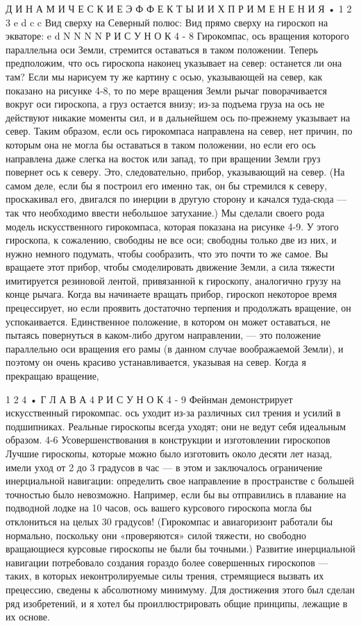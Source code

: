 \documentclass[10pt,oneside]{article}
\begin{document}
Д И Н А М И Ч Е С К И Е  Э Ф Ф Е К Т Ы  И  И Х  П Р И М Е Н Е Н И Я • 1 2 3 e d c c Вид сверху на Северный полюс: Вид прямо сверху на гироскоп на экваторе: e d N N N N Р И С У Н О К  4 - 8 Гирокомпас, ось вращения которого параллельна оси Земли, стремится оставаться в таком положении. Теперь предположим, что ось гироскопа наконец указывает на север: останется ли она там? Если мы нарисуем ту же картину с осью, указывающей на север, как показано на рисунке 4-8, то по мере вращения Земли рычаг поворачивается вокруг оси гироскопа, а груз остается внизу; из-за подъема груза на ось не действуют никакие моменты сил, и в дальнейшем ось по-прежнему указывает на север. Таким образом, если ось гирокомпаса направлена на север, нет причин, по которым она не могла бы оставаться в таком положении, но если его ось направлена даже слегка на восток или запад, то при вращении Земли груз повернет ось к северу. Это, следовательно, прибор, указывающий на север. (На самом деле, если бы я построил его именно так, он бы стремился к северу, проскакивал его, двигался по инерции в другую сторону и качался туда-сюда --- так что необходимо ввести небольшое затухание.) Мы сделали своего рода модель искусственного гирокомпаса, которая показана на рисунке 4-9. У этого гироскопа, к сожалению, свободны не все оси; свободны только две из них, и нужно немного подумать, чтобы сообразить, что это почти то же самое. Вы вращаете этот прибор, чтобы смоделировать движение Земли, а сила тяжести имитируется резиновой лентой, привязанной к гироскопу, аналогично грузу на конце рычага. Когда вы начинаете вращать прибор, гироскоп некоторое время прецессирует, но если проявить достаточно терпения и продолжать вращение, он успокаивается. Единственное положение, в котором он может оставаться, не пытаясь повернуться в каком-либо другом направлении, --- это положение параллельно оси вращения его рамы (в данном случае воображаемой Земли), и поэтому он очень красиво устанавливается, указывая на север. Когда я прекращаю вращение,\par

1 2 4 • Г Л А В А  4 Р И С У Н О К  4 - 9 Фейнман демонстрирует искусственный гирокомпас. ось уходит из-за различных сил трения и усилий в подшипниках. Реальные гироскопы всегда уходят; они не ведут себя идеальным образом. 4-6 Усовершенствования в конструкции и изготовлении гироскопов Лучшие гироскопы, которые можно было изготовить около десяти лет назад, имели уход от 2 до 3 градусов в час --- в этом и заключалось ограничение инерциальной навигации: определить свое направление в пространстве с большей точностью было невозможно. Например, если бы вы отправились в плавание на подводной лодке на 10 часов, ось вашего курсового гироскопа могла бы отклониться на целых 30 градусов! (Гирокомпас и авиагоризонт работали бы нормально, поскольку они «проверяются» силой тяжести, но свободно вращающиеся курсовые гироскопы не были бы точными.) Развитие инерциальной навигации потребовало создания гораздо более совершенных гироскопов --- таких, в которых неконтролируемые силы трения, стремящиеся вызвать их прецессию, сведены к абсолютному минимуму. Для достижения этого был сделан ряд изобретений, и я хотел бы проиллюстрировать общие принципы, лежащие в их основе.\par
\end{document}
